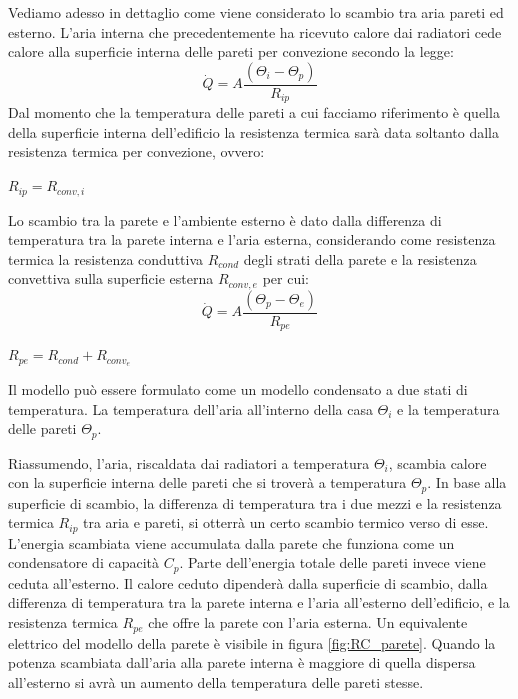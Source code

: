 \documentclass[laurea,oneside,11pt]{USiena_tesiLM}
\begin{document}
Vediamo adesso in dettaglio come viene considerato lo scambio tra aria pareti ed esterno. L'aria interna che precedentemente ha ricevuto calore dai radiatori cede calore alla superficie interna delle pareti per convezione secondo la legge:
\begin{equation}
\dot{Q} = A \frac{(\Theta_i - \Theta_p)}{R_{ip}} 
\end{equation} 
Dal momento che la temperatura delle pareti a cui facciamo riferimento è quella della superficie interna dell'edificio la resistenza termica sarà data soltanto dalla resistenza termica per convezione, ovvero:
\begin{center}
$R_{ip} = R_{conv,i}$
\end{center}

Lo scambio tra la parete e l'ambiente esterno è dato dalla differenza di temperatura tra la parete interna e l'aria  esterna, considerando come resistenza termica la resistenza conduttiva $R_{cond}$ degli strati della parete e la resistenza convettiva sulla superficie esterna $R_{conv,e}$ per cui:
\begin{equation}
\dot{Q} = A \frac{(\Theta_p - \Theta_e)}{R_{pe}} 
\end{equation} 
\begin{center}
$R_{pe} = R_{cond} + R_{conv_e}$
\end{center}

Il modello può essere formulato come un modello condensato a due stati di temperatura. La temperatura dell'aria all'interno della casa $\Theta_i$ e la temperatura delle pareti $\Theta_p$.

Riassumendo, l'aria, riscaldata dai radiatori a temperatura $\Theta_i$, scambia calore con la superficie interna delle pareti che si troverà a temperatura $\Theta_p$. In base alla superficie di scambio, la differenza di temperatura tra i due mezzi e la resistenza termica $R_{ip}$ tra aria e pareti, si otterrà un certo scambio termico verso di esse. L'energia scambiata viene accumulata dalla parete che funziona come un condensatore di capacità $C_p$. Parte dell'energia totale delle pareti invece viene ceduta all'esterno. Il calore ceduto dipenderà dalla superficie di scambio, dalla differenza di temperatura tra la parete interna e l'aria all'esterno dell'edificio, e la resistenza termica $R_{pe}$ che offre la parete con l'aria esterna.  Un equivalente elettrico del modello della parete è visibile in figura \ref{fig:RC_parete}.
Quando la potenza scambiata dall'aria alla parete  interna è maggiore di quella dispersa all'esterno si avrà un aumento della temperatura delle pareti stesse.
\end{document}

